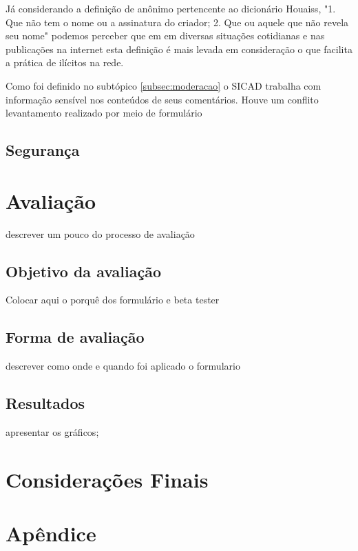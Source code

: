 \documentclass[12pt, a4paper]{report}
\begin{document}
Já considerando a definição de anônimo pertencente ao dicionário Houaiss, "1. Que não tem o nome ou a assinatura do criador; 2. Que ou aquele que não revela seu nome" \cite[p. 7]{houasis2001} podemos perceber que em em diversas situações cotidianas e nas publicações na internet esta definição é mais levada em consideração o que facilita a prática de ilícitos na rede.

Como foi definido no subtópico \ref{subsec:moderacao} o SICAD trabalha com informação sensível nos conteúdos de seus comentários. Houve um conflito levantamento realizado por meio de formulário  


\section{ Segurança}



\chapter{Avaliação}
\par descrever um pouco do processo de avaliação
\section{Objetivo da avaliação }
\par  Colocar aqui o porquê dos formulário e beta tester
\section{Forma de avaliação }
\par descrever como onde e quando foi aplicado o formulario
\section{Resultados } 
\par apresentar os gráficos;
\chapter{Considerações Finais}


\renewcommand\bibname{Referências}

%
%

\nocite{*}


\appendix
\chapter{Apêndice}

\label{whatever}
\end{document}
